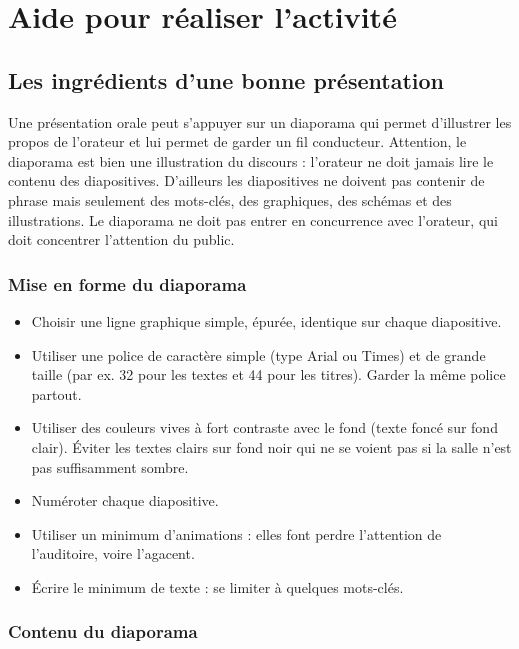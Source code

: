 


\newpage

\section{Aide pour réaliser l'activité}\label{aidePresentation}

\subsection{Les ingrédients d'une bonne présentation}

Une présentation orale peut s'appuyer sur un diaporama qui permet d'illustrer les propos de l'orateur et lui permet de garder un fil conducteur. Attention, le diaporama est bien une illustration du discours : l'orateur ne doit jamais lire le contenu des diapositives. D'ailleurs les diapositives ne doivent pas contenir de phrase mais seulement des mots-clés, des graphiques, des schémas et des illustrations. Le diaporama ne doit pas entrer en concurrence avec l'orateur, qui doit concentrer l'attention du public.

\subsubsection{Mise en forme du diaporama}

\begin{itemize}
\item Choisir une ligne graphique simple, épurée, identique sur chaque diapositive.
\item Utiliser une police de caractère simple (type Arial ou Times) et de grande taille (par ex. 32 pour les textes et 44 pour les titres). Garder la même police partout.
\item Utiliser des couleurs vives à fort contraste avec le fond (texte foncé sur fond clair). Éviter les textes clairs sur fond noir qui ne se voient pas si la salle n'est pas suffisamment sombre.
\item Numéroter chaque diapositive.
\item Utiliser un minimum d'animations : elles font perdre l'attention de l'auditoire, voire l'agacent.
\item Écrire le minimum de texte : se limiter à quelques mots-clés.
\end{itemize}

\subsubsection{Contenu du diaporama}

